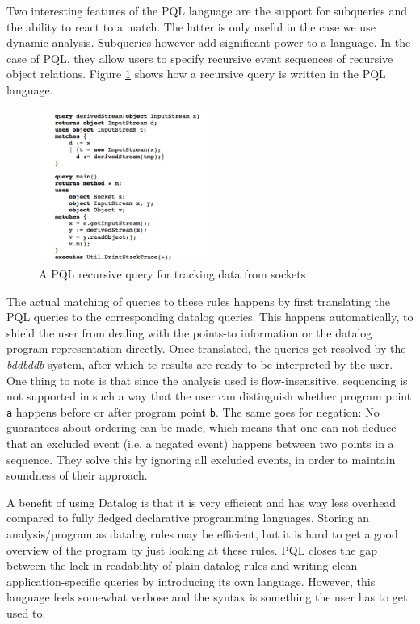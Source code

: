 Two interesting features of the PQL language are the support for subqueries and the ability to react to a match. The latter is only useful in the case we use dynamic analysis. Subqueries however add significant power to a language. In the case of PQL, they allow users to specify recursive event sequences of recursive object relations. Figure \ref{fig:derivedStream} shows how a recursive query is written in the PQL language.

\begin{figure}[!ht]
    \centering
      \includegraphics[width=0.5\textwidth]{images/derivedStream} 
      \caption{A PQL recursive query for tracking data from sockets}
    \label{fig:derivedStream}
\end{figure}

The actual matching of queries to these rules happens by first translating the PQL queries to the corresponding datalog queries. This happens automatically, to shield the user from dealing with the points-to information or the datalog program representation directly. Once translated, the queries get resolved by the \textit{bddbddb} system, after which te results are ready to be interpreted by the user. One thing to note is that since the analysis used is flow-insensitive, sequencing is not supported in such a way that the user can distinguish whether program point \texttt{a} happens before or after program point \texttt{b}. The same goes for negation: No guarantees about ordering can be made, which means that one can not deduce that an excluded event (i.e. a negated event) happens between two points in a sequence. They solve this by ignoring all excluded events, in order to maintain soundness of their approach.

A benefit of using Datalog is that it is very efficient and has way less overhead compared to fully fledged declarative programming languages. Storing an analysis/program as datalog rules may be efficient, but it is hard to get a good overview of the program by just looking at these rules. PQL closes the gap between the lack in readability of plain datalog rules and writing clean application-specific queries by introducing its own language. However, this language feels somewhat verbose and the syntax is something the user has to get used to.

